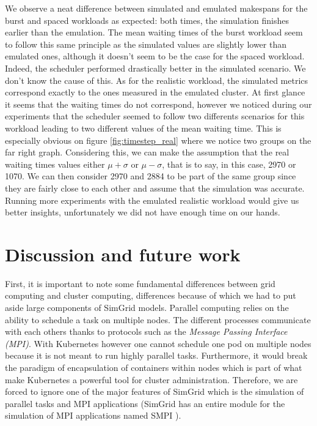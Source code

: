 We observe a neat difference between simulated and emulated makespans for the
burst and spaced workloads as expected: both times, the simulation finishes
earlier than the emulation. The mean waiting times of the burst workload seem
to follow this same principle as the simulated values are slightly lower than
emulated ones, although it doesn't seem to be the case for the spaced workload.
Indeed, the scheduler performed drastically better in the simulated scenario.
We don't know the cause of this. As for the realistic workload, the simulated
metrics correspond exactly to the ones measured in the emulated cluster. At
first glance it seems that the waiting times do not correspond, however we
noticed during our experiments that the scheduler seemed to follow two
differents scenarios for this workload leading to two different values of the
mean waiting time.  This is especially obvious on figure
\ref{fig:timestep_real} where we notice two groups on the far right graph.
Considering this, we can make the assumption that the real waiting times values
either $\mu + \sigma$ or $\mu - \sigma$, that is to say, in this case, 2970 or
1070. We can then consider 2970 and 2884 to be part of the same group since
they are fairly close to each other and assume that the simulation was
accurate. Running more experiments with the emulated realistic workload would
give us better insights, unfortunately we did not have enough time on our
hands.

\section{Discussion and future work}

First, it is important to note some fundamental differences between grid
computing and cluster computing, differences because of which we had to put
aside large components of SimGrid models. Parallel computing relies on the
ability to schedule a task on multiple nodes.  The different processes
communicate with each others thanks to protocols such as the \textit{Message
Passing Interface (MPI)}. With Kubernetes however one cannot schedule one pod
on multiple nodes because it is not meant to run highly parallel tasks.
Furthermore, it would break the paradigm of encapsulation of containers within
nodes which is part of what make Kubernetes a powerful tool for cluster
administration.  Therefore, we are forced to ignore one of the major features
of SimGrid which is the simulation of parallel tasks and MPI applications
(SimGrid has an entire module for the simulation of MPI applications named SMPI
\cite{casanova:hal-01017319}).\\

